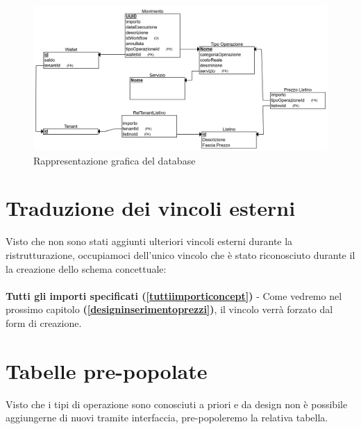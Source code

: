 \begin{figure}[H]
  \centering
  \includegraphics[width=13cm]{images/db-diagrams/rappresentazione-grafica-db.png}
  \caption{Rappresentazione grafica del database}
\end{figure}

\section{Traduzione dei vincoli esterni}
Visto che non sono stati aggiunti ulteriori vincoli esterni durante la ristrutturazione, occupiamoci dell'unico vincolo che \`e stato riconosciuto durante il la creazione dello
schema concettuale:
\\\\
\textbf{Tutti gli importi specificati (\ref{tuttiimporticoncept})} - Come vedremo nel prossimo capitolo \textbf{(\ref{designinserimentoprezzi})}, il vincolo verr\`a forzato dal form di creazione.

\section {Tabelle pre-popolate}
Visto che i tipi di operazione sono conosciuti a priori e da design non \`e possibile aggiungerne di nuovi tramite interfaccia, pre-popoleremo la relativa tabella.
